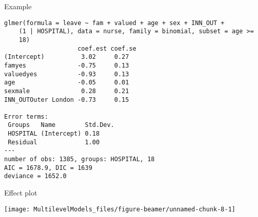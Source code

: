 \documentclass[10pt,ignorenonframetext,]{beamer}
\begin{document}
\begin{frame}[fragile]{Example}

\begin{verbatim}
glmer(formula = leave ~ fam + valued + age + sex + INN_OUT + 
    (1 | HOSPITAL), data = nurse, family = binomial, subset = age >= 
    18)
                    coef.est coef.se
(Intercept)          3.02     0.27  
famyes              -0.75     0.13  
valuedyes           -0.93     0.13  
age                 -0.05     0.01  
sexmale              0.28     0.21  
INN_OUTOuter London -0.73     0.15  

Error terms:
 Groups   Name        Std.Dev.
 HOSPITAL (Intercept) 0.18    
 Residual             1.00    
---
number of obs: 1385, groups: HOSPITAL, 18
AIC = 1678.9, DIC = 1639
deviance = 1652.0 
\end{verbatim}

\end{frame}

\begin{frame}{Effect plot}

\begin{center}\texttt{[image: MultilevelModels\_files/figure-beamer/unnamed-chunk-8-1]} \end{center}

\end{frame}
\end{document}
